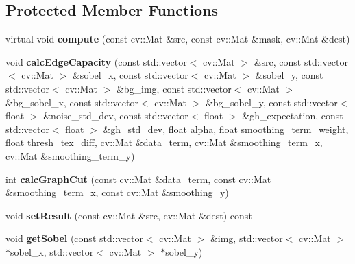 \subsection*{Protected Member Functions}
\begin{DoxyCompactItemize}
\item 
\hypertarget{classskl_1_1_tex_cut_a152906ca9a37972c1e9a80a9dc79093a}{}\label{classskl_1_1_tex_cut_a152906ca9a37972c1e9a80a9dc79093a} 
virtual void {\bfseries compute} (const cv\+::\+Mat \&src, const cv\+::\+Mat \&mask, cv\+::\+Mat \&dest)
\item 
\hypertarget{classskl_1_1_tex_cut_ae5f234d5a13fd3a9bbb24bf498b3ba5b}{}\label{classskl_1_1_tex_cut_ae5f234d5a13fd3a9bbb24bf498b3ba5b} 
void {\bfseries calc\+Edge\+Capacity} (const std\+::vector$<$ cv\+::\+Mat $>$ \&src, const std\+::vector$<$ cv\+::\+Mat $>$ \&sobel\+\_\+x, const std\+::vector$<$ cv\+::\+Mat $>$ \&sobel\+\_\+y, const std\+::vector$<$ cv\+::\+Mat $>$ \&bg\+\_\+img, const std\+::vector$<$ cv\+::\+Mat $>$ \&bg\+\_\+sobel\+\_\+x, const std\+::vector$<$ cv\+::\+Mat $>$ \&bg\+\_\+sobel\+\_\+y, const std\+::vector$<$ float $>$ \&noise\+\_\+std\+\_\+dev, const std\+::vector$<$ float $>$ \&gh\+\_\+expectation, const std\+::vector$<$ float $>$ \&gh\+\_\+std\+\_\+dev, float alpha, float smoothing\+\_\+term\+\_\+weight, float thresh\+\_\+tex\+\_\+diff, cv\+::\+Mat \&data\+\_\+term, cv\+::\+Mat \&smoothing\+\_\+term\+\_\+x, cv\+::\+Mat \&smoothing\+\_\+term\+\_\+y)
\item 
\hypertarget{classskl_1_1_tex_cut_a7bf838818a360db04e0eb97d6e1de769}{}\label{classskl_1_1_tex_cut_a7bf838818a360db04e0eb97d6e1de769} 
int {\bfseries calc\+Graph\+Cut} (const cv\+::\+Mat \&data\+\_\+term, const cv\+::\+Mat \&smoothing\+\_\+term\+\_\+x, const cv\+::\+Mat \&smoothing\+\_\+y)
\item 
\hypertarget{classskl_1_1_tex_cut_a9e2020aee23f54d8e2dcc259415959c4}{}\label{classskl_1_1_tex_cut_a9e2020aee23f54d8e2dcc259415959c4} 
void {\bfseries set\+Result} (const cv\+::\+Mat \&src, cv\+::\+Mat \&dest) const
\item 
\hypertarget{classskl_1_1_tex_cut_a204850a2ef37ed0a86d9b387f68cee40}{}\label{classskl_1_1_tex_cut_a204850a2ef37ed0a86d9b387f68cee40} 
void {\bfseries get\+Sobel} (const std\+::vector$<$ cv\+::\+Mat $>$ \&img, std\+::vector$<$ cv\+::\+Mat $>$ $\ast$sobel\+\_\+x, std\+::vector$<$ cv\+::\+Mat $>$ $\ast$sobel\+\_\+y)
\end{DoxyCompactItemize}

